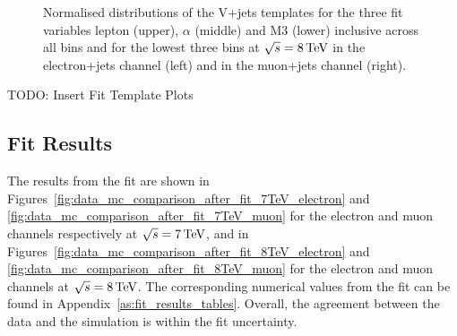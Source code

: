 \begin{figure}[hbtp]
	 \caption[Normalised distributions of the V+jets templates for the three fit variables in \met
	 bins.]{Normalised distributions of the V+jets templates for the three fit variables lepton \abseta (upper),
	 $\alpha$ (middle) and M3 (lower) inclusive across all \met bins and for the lowest three \met bins at
	 $\sqrt{s}=8\,\text{Te\hspace{-.08em}V}$ in the electron+jets channel (left) and in the muon+jets channel (right).}
     \label{fig:MET_fit_variable_vjets_comparisons_8TeV}
\end{figure}

\FloatBarrier
TODO: Insert Fit Template Plots

\subsection{Fit Results}
\label{ss:fit_results}
The results from the fit are shown in Figures~\ref{fig:data_mc_comparison_after_fit_7TeV_electron} and
\ref{fig:data_mc_comparison_after_fit_7TeV_muon} for the electron and muon channels respectively at
$\sqrt{s}=7\,\text{Te\hspace{-.08em}V}$, and in Figures~\ref{fig:data_mc_comparison_after_fit_8TeV_electron} and
\ref{fig:data_mc_comparison_after_fit_8TeV_muon} for the electron and muon channels at $\sqrt{s}=8\,\text{Te\hspace{-.08em}V}$. The
corresponding numerical values from the fit can be found in Appendix~\ref{as:fit_results_tables}. Overall, the
agreement between the data and the simulation is within the fit uncertainty. 

